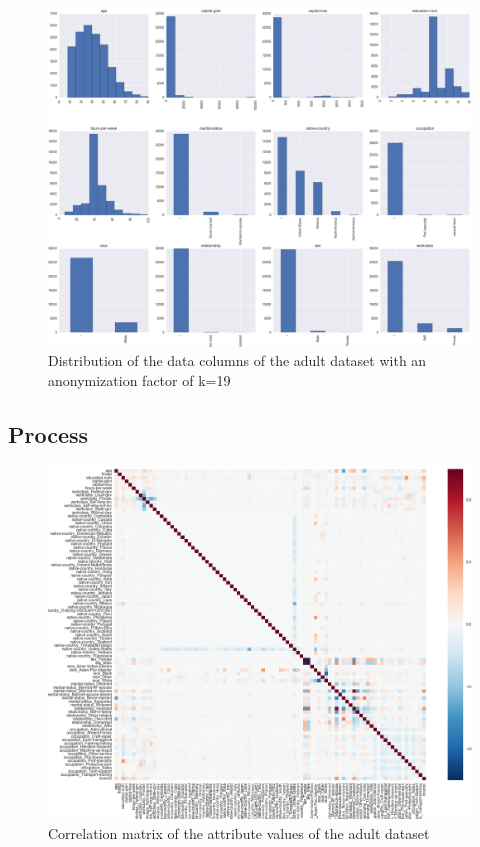 \documentclass{llncs}
\begin{document}
\begin{figure}[H]
	\begin{center}
    	\hspace*{-1cm}
		\includegraphics[width=1.2\textwidth]{figures/experiment/anon_distribution}
		\caption{Distribution of the data columns of the adult dataset with an anonymization factor of k=19}
		\label{fig:adult_anonymized_distribution}
	\end{center}
\end{figure}


\subsection{Process}
\label{ssect:process}

\begin{figure}[H]
	\begin{center}
    	\hspace*{-1.5cm}
		\includegraphics[width=1.3\textwidth]{figures/experiment/correlation_big}
		\caption{Correlation matrix of the attribute values of the adult dataset}
		\label{fig:adult_correlation_big}
	\end{center}
\end{figure}
\end{document}
